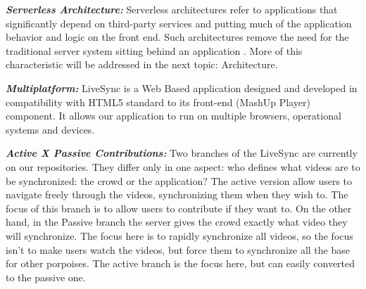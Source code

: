 \textbf{\textit{Serverless Architecture:}} Serverless architectures refer to applications that significantly depend on third-party services and putting much of the application behavior and logic on the front end. Such architectures remove the need for the traditional server system sitting behind an application \cite{RobertServerless}. More of this characteristic will be addressed in the next topic: Architecture.

\textbf{\textit{Multiplatform:}} LiveSync is a Web Based application designed and developed in compatibility with HTML5 standard to its front-end (MashUp Player) component. It allows our application to run on multiple browsers, operational systems and devices.

\textbf{\textit{Active X Passive Contributions:}} Two branches of the LiveSync are currently on our repositories. They differ only in one aspect: who defines what videos are to be synchronized: the crowd or the application? The active version allow users to navigate freely through the videos, synchronizing them when they wish to. The focus of this branch is to allow users to contribute if they want to. On the other hand, in the Passive branch the server gives the crowd exactly what video they will synchronize. The focus here is to rapidly synchronize all videos, so the focus isn't to make users watch the videos, but force them to synchronize all the base for other porpoises. The active branch is the focus here, but can easily converted to the passive one.
